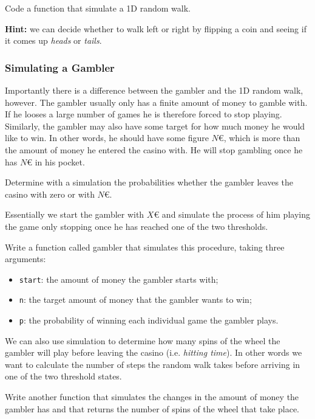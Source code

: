 \documentclass[12pt,a4paper]{article}
\begin{document}
\begin{question}
Code a function that simulate a 1D random walk. 

\noindent
\textbf{Hint:} we can decide whether to walk left or right by flipping a coin and seeing if it comes up \emph{heads} or \emph{tails}.
\end{question}

\subsubsection{Simulating a Gambler}

Importantly there is a difference between the gambler and the 1D random walk, however. The gambler usually only has a finite amount of money to gamble with. If he looses a large number of games he is therefore forced to stop playing. Similarly, the gambler may also have some target for how much money he would like to win. In other words, he should have some figure $N$€, which is more than the amount of money he entered the casino with. He will stop gambling once he has $N$€ in his pocket.

\begin{question}
Determine with a simulation the probabilities whether the gambler leaves the casino with zero or with $N$€.

Essentially we start the gambler with $X$€ and simulate the process of him playing the game only stopping once he has reached one of the two thresholds.

Write a function called gambler that simulates this procedure, taking three arguments:
\begin{itemize}
\item \texttt{start}: the amount of money the gambler starts with; \item \texttt{n}: the target amount of money that the gambler wants to win;
\item \texttt{p}: the probability of winning each individual game the gambler plays.
\end{itemize}
\end{question}

We can also use simulation to determine how many spins of the wheel the gambler will play before leaving the casino (i.e. \emph{hitting time}).
In other words we want to calculate the number of steps the random walk takes before arriving in one of the two threshold states.

\begin{question}
Write another function that simulates the changes in the amount of money the gambler has and that returns the number of spins of the wheel that take place.
\end{question}
\end{document}
